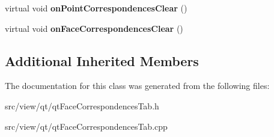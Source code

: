 \begin{DoxyCompactItemize}
\item 
\hypertarget{classqt_face_correspondences_tab_ad269bd09d424447acf38503ba3f4c92d}{}virtual void {\bfseries on\+Point\+Correspondences\+Clear} ()\label{classqt_face_correspondences_tab_ad269bd09d424447acf38503ba3f4c92d}

\item 
\hypertarget{classqt_face_correspondences_tab_a501483fe0ff0919be4596518dd1ff05c}{}virtual void {\bfseries on\+Face\+Correspondences\+Clear} ()\label{classqt_face_correspondences_tab_a501483fe0ff0919be4596518dd1ff05c}

\end{DoxyCompactItemize}
\subsection*{Additional Inherited Members}


The documentation for this class was generated from the following files\+:\begin{DoxyCompactItemize}
\item 
src/view/qt/qt\+Face\+Correspondences\+Tab.\+h\item 
src/view/qt/qt\+Face\+Correspondences\+Tab.\+cpp\end{DoxyCompactItemize}

